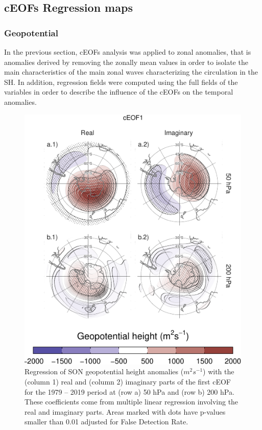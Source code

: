 \documentclass[smallextended]{svjour3}       %
\begin{document}
\hypertarget{regressions}{%
\subsection{cEOFs Regression maps}\label{regressions}}

\hypertarget{geopotential}{%
\subsubsection{Geopotential}\label{geopotential}}

In the previous section, cEOFs analysis was applied to zonal anomalies, that is anomalies derived by removing the zonally mean values in order to isolate the main characteristics of the main zonal waves characterizing the circulation in the SH.
In addition, regression fields were computed using the full fields of the variables in order to describe the influence of the cEOFs on the temporal anomalies.



\begin{figure}
\centering
\includegraphics{../figures/eof1-regr-gh-1.pdf}
\caption{\label{fig:eof1-regr-gh}Regression of SON geopotential height anomalies (\(m^2s^{-1}\)) with the (column 1) real and (column 2) imaginary parts of the first cEOF for the 1979 -- 2019 period at (row a) 50 hPa and (row b) 200 hPa. These coefficients come from multiple linear regression involving the real and imaginary parts. Areas marked with dots have p-values smaller than 0.01 adjusted for False Detection Rate.}
\end{figure}
\end{document}
